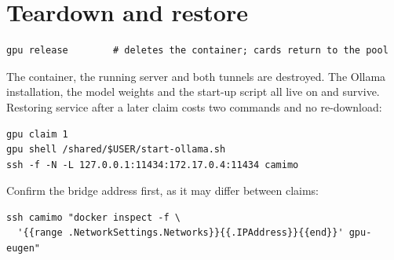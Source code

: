 \section{Teardown and restore}
\label{sec:teardown}

\begin{lstlisting}
gpu release        # deletes the container; cards return to the pool
\end{lstlisting}

The container, the running server and both tunnels are destroyed. The Ollama
installation, the model weights and the start-up script all live on
 and survive. Restoring service after a later claim costs two
commands and no re-download:

\begin{lstlisting}
gpu claim 1
gpu shell /shared/$USER/start-ollama.sh
ssh -f -N -L 127.0.0.1:11434:172.17.0.4:11434 camimo
\end{lstlisting}

Confirm the bridge address first, as it may differ between claims:

\begin{lstlisting}
ssh camimo "docker inspect -f \
  '{{range .NetworkSettings.Networks}}{{.IPAddress}}{{end}}' gpu-eugen"
\end{lstlisting}
